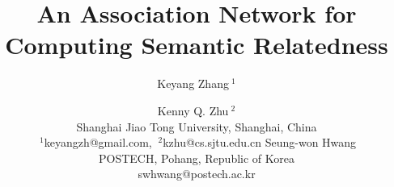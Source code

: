 \documentclass[letterpaper]{article}
\begin{document}

\title{An Association Network for Computing Semantic Relatedness}
\author{
Keyang Zhang{\small $~^{1}$} \and Kenny Q. Zhu{\small $~^{2}$}\\
Shanghai Jiao Tong University, Shanghai, China\\
{\small $~^{1}$}keyangzh@gmail.com, {\small $~^{2}$}kzhu@cs.sjtu.edu.cn
\And
Seung-won Hwang\\
POSTECH, Pohang, Republic of Korea\\
swhwang@postech.ac.kr
}
\maketitle
\end{document}
